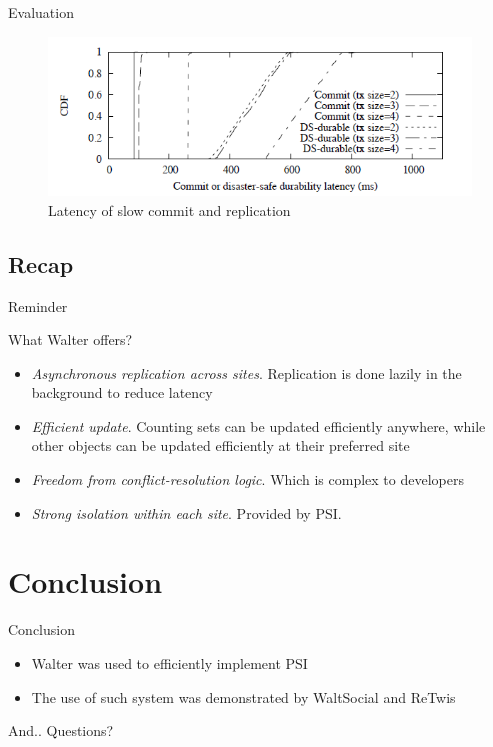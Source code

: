 \documentclass{beamer}
\begin{document}
	\begin{frame}{Evaluation}	
	
	\begin{figure}[H]
	\includegraphics[scale=0.45]{img/fig_evaluation03.png}
	\caption{Latency of slow commit and replication}
	\end{figure}	
	
	\end{frame}	
	
	\subsection*{Recap}
	
	\begin{frame}{Reminder}
	
		What Walter offers?	
	
		\begin{itemize}
		\item \textit{Asynchronous replication across sites}. Replication is done lazily in the background to reduce latency
		\item \textit{Efficient update}. Counting sets can be updated efficiently anywhere, while other objects can be updated efficiently at their preferred site
		\item \textit{Freedom from conflict-resolution logic}. Which is complex to developers
		\item \textit{Strong isolation within each site}. Provided by PSI.
		\end{itemize}
	\end{frame}


\section{Conclusion}

\begin{frame}{Conclusion}

		\begin{itemize}%
		\item Walter was used to efficiently implement PSI
		\item The use of such system was demonstrated by WaltSocial and ReTwis
		\end{itemize}

\end{frame}

\begin{frame}

	\begin{block}{And.. }
	Questions?
	\end{block}

\end{frame}
\end{document}
